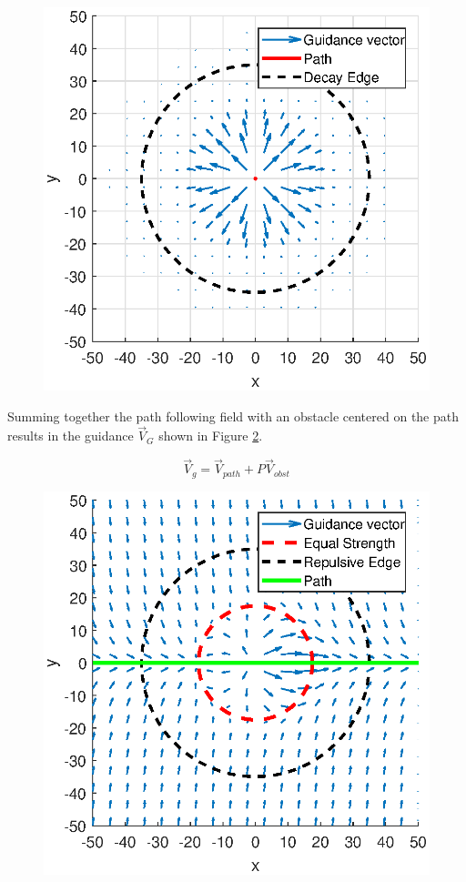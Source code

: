 \documentclass[conf]{new-aiaa}
\begin{document}
\begin{figure}[H]
	\centering
	\includegraphics[width=0.7\linewidth]{Figures/methods/decayApplied}
	\caption{}
	\label{fig:decayapplied}
\end{figure}


Summing together the path following field with an obstacle centered on the path results in the guidance $\overrightarrow{V}_G$ shown in Figure \ref{fig:summedquiver}.

\begin{equation}
\label{eq:singularityCondition}
\overrightarrow{V}_g = \overrightarrow{V}_{path} + P\overrightarrow{V}_{obst}
\end{equation}




\begin{figure}[H]
	\centering
	\includegraphics[width=0.7\linewidth]{Figures/methods/summedQuiver}
	\caption{}
	\label{fig:summedquiver}
\end{figure}
\end{document}

